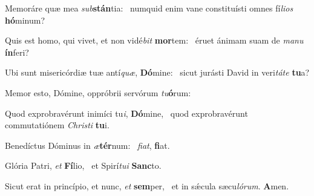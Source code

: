 \item Memoráre quæ mea \textit{sub}\textbf{stán}tia:~\psstar{} numquid enim vane constituísti omnes fí\textit{lios} \textbf{hó}minum?
\item Quis est homo, qui vivet, et non vidé\textit{bit} \textbf{mor}tem:~\psstar{} éruet ánimam suam de \textit{manu} \textbf{ín}feri?
\item Ubi sunt misericórdiæ tuæ antí\textit{quæ}, \textbf{Dó}mine:~\psstar{} sicut jurásti David in veri\textit{táte} \textbf{tu}a?
\item Memor esto, Dómine, oppróbrii servórum \textit{tu}\textbf{ó}rum:~\psstar{} 
\item Quod exprobravérunt inimíci tu\textit{i}, \textbf{Dó}mine,~\psstar{} quod exprobravérunt commutatiónem \textit{Christi} \textbf{tu}i.
\item Benedíctus Dóminus in \textit{æ}\textbf{tér}num:~\psstar{} \textit{fiat}, \textbf{fi}at.
\item Glória Patri, \textit{et} \textbf{Fí}lio,~\psstar{} et Spirí\textit{tui} \textbf{Sanc}to.
\item Sicut erat in princípio, et nunc, \textit{et} \textbf{sem}per,~\psstar{} et in sǽcula sæcu\textit{lórum}. \textbf{A}men.

